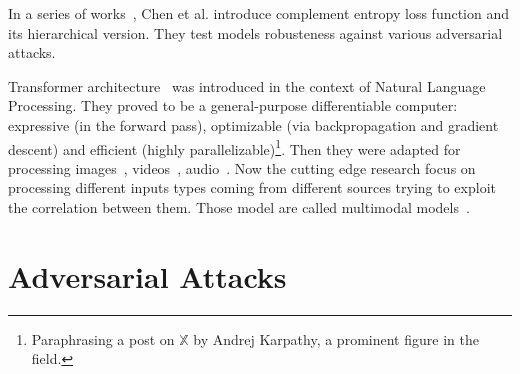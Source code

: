 %

In a series of works~\cite{ComplementObjeChen2019, ImprovingAdverChen2019,
LearningWithHChen2019}, Chen et al. introduce complement entropy loss function
and its hierarchical version. They test models robusteness against various
adversarial attacks.

Transformer architecture~\cite{AttentionIsAlVaswan2017} was introduced in the
context of Natural Language Processing. They proved to be a general-purpose
differentiable computer: expressive (in the forward pass), optimizable (via
backpropagation and gradient descent) and efficient (highly
parallelizable)\footnote{Paraphrasing a post on $\mathbb{X}$ by Andrej
Karpathy, a prominent figure in the field.}. Then they were adapted for
processing images~\cite{ImageTransformParmar2018, EndToEndObjeCarion2020,
AnImageIsWorDosovi2020}, videos~\cite{VivitAVideoArnab2021,
TemporalContexShao2020}, audio~\cite{NeuralSpeechSLiNa2018,
SpeechTransforDong2018, ConformerConvGulati2020}. Now the cutting edge research
focus on processing different inputs types coming from different sources trying
to exploit the correlation between them. Those model are called multimodal
models~\cite{ASurveyOnMulYinS2023}.

\section{Adversarial Attacks}
\label{sec:adversarial-attacks}



